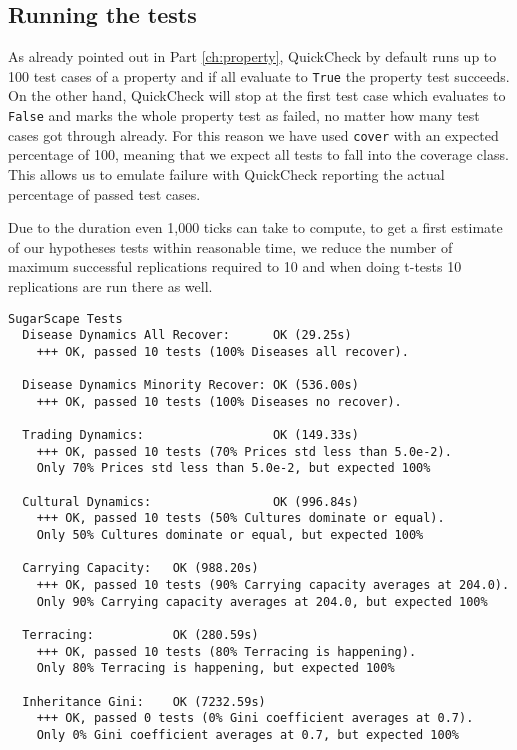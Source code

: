 
\subsection{Running the tests}
As already pointed out in Part \ref{ch:property}, QuickCheck by default runs up to 100 test cases of a property and if all evaluate to \texttt{True} the property test succeeds. On the other hand, QuickCheck will stop at the first test case which evaluates to \texttt{False} and marks the whole property test as failed, no matter how many test cases got through already. For this reason we have used \texttt{cover} with an expected percentage of 100, meaning that we expect all tests to fall into the coverage class. This allows us to emulate failure with QuickCheck reporting the actual percentage of passed test cases.

Due to the duration even 1,000 ticks can take to compute, to get a first estimate of our hypotheses tests within reasonable time, we reduce the number of maximum successful replications required to 10 and when doing t-tests 10 replications are run there as well. 

\begin{verbatim}
SugarScape Tests
  Disease Dynamics All Recover:      OK (29.25s)
    +++ OK, passed 10 tests (100% Diseases all recover).
    
  Disease Dynamics Minority Recover: OK (536.00s)
    +++ OK, passed 10 tests (100% Diseases no recover).
    
  Trading Dynamics:                  OK (149.33s)
    +++ OK, passed 10 tests (70% Prices std less than 5.0e-2).
    Only 70% Prices std less than 5.0e-2, but expected 100%
    
  Cultural Dynamics:                 OK (996.84s)
    +++ OK, passed 10 tests (50% Cultures dominate or equal).
    Only 50% Cultures dominate or equal, but expected 100%
    
  Carrying Capacity:   OK (988.20s)
    +++ OK, passed 10 tests (90% Carrying capacity averages at 204.0).    
    Only 90% Carrying capacity averages at 204.0, but expected 100%
    
  Terracing:           OK (280.59s)
    +++ OK, passed 10 tests (80% Terracing is happening).
    Only 80% Terracing is happening, but expected 100%
    
  Inheritance Gini:    OK (7232.59s)
    +++ OK, passed 0 tests (0% Gini coefficient averages at 0.7).
    Only 0% Gini coefficient averages at 0.7, but expected 100%
\end{verbatim}

